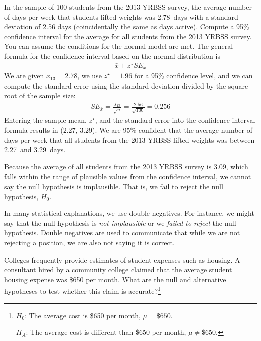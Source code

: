 \begin{example}{In the sample of 100 students from the 2013 YRBSS survey, the average number of days per week that students lifted weights was 2.78~days with a standard deviation of 2.56 days (coincidentally the same as days active). Compute a 95\% confidence interval for the average for all students from the 2013 YRBSS survey. You can assume the conditions for the normal model are met.}
The general formula for the confidence interval based on the normal distribution is
\begin{align*}
\bar{x} \pm z^{\star} SE_{\bar{x}}
\end{align*}
We are given $\bar{x}_{13} = 2.78$, we use $z^{\star} = 1.96$ for a 95\% confidence level, and we can compute the standard error using the standard deviation divided by the square root of the sample size:
\begin{align*}
SE_{\bar{x}} = \frac{s_{13}}{\sqrt{n}} = \frac{2.56}{\sqrt{100}} = 0.256
\end{align*}
Entering the sample mean, $z^{\star}$, and the standard error into the confidence interval formula results in (2.27, 3.29). We are 95\% confident that the average number of days per week that all students from the 2013 YRBSS lifted weights was between 2.27~and 3.29~days.
\end{example}

Because the average of all students from the 2013 YRBSS survey is 3.09, which falls within the range of plausible values from the confidence interval, we cannot say the null hypothesis is implausible. That is, we fail to reject the null hypothesis, $H_0$.

\begin{tipBox}{
In many statistical explanations, we use double negatives. For instance, we might say that the null hypothesis is \emph{not implausible} or we \emph{failed to reject} the null hypothesis. Double negatives are used to communicate that while we are not rejecting a position, we are also not saying it is correct.}
\end{tipBox}

\begin{exercise} \label{htForHousingExpenseForCommunityCollege650}
Colleges frequently provide estimates of student expenses such as housing. A consultant hired by a community college claimed that the average student housing expense was \$650 per month. What are the null and alternative hypotheses to test whether this claim is accurate?\footnote{$H_0$: The average cost is \$650 per month, $\mu = \$650$.

\hspace{3.4mm}$H_A$: The average cost is different than \$650 per month, $\mu \neq \$650$.}
\end{exercise}

